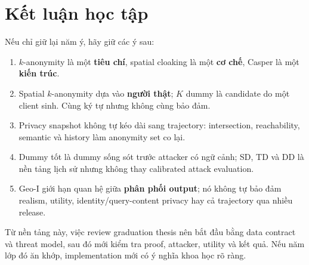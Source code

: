 \documentclass[11pt,a4paper,oneside]{report}
\begin{document}
\chapter*{Kết luận học tập}

Nếu chỉ giữ lại năm ý, hãy giữ các ý sau:

\begin{enumerate}
  \item $k$-anonymity là một \textbf{tiêu chí}, spatial cloaking là một
  \textbf{cơ chế}, Casper là một \textbf{kiến trúc}.
  \item Spatial $k$-anonymity dựa vào \textbf{người thật}; $K$ dummy là candidate
  do một client sinh. Cùng ký tự nhưng không cùng bảo đảm.
  \item Privacy snapshot không tự kéo dài sang trajectory: intersection, reachability,
  semantic và history làm anonymity set co lại.
  \item Dummy tốt là dummy sống sót trước attacker có ngữ cảnh; SD, TD và DD là
  nền tảng lịch sử nhưng không thay calibrated attack evaluation.
  \item Geo-I giới hạn quan hệ giữa \textbf{phân phối output}; nó không tự bảo đảm
  realism, utility, identity/query-content privacy hay cả trajectory qua nhiều release.
\end{enumerate}

Từ nền tảng này, việc review graduation thesis nên bắt đầu bằng data contract và
threat model, sau đó mới kiểm tra proof, attacker, utility và kết quả. Nếu năm lớp
đó ăn khớp, implementation mới có ý nghĩa khoa học rõ ràng.
\end{document}
